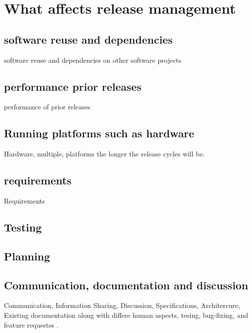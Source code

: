 \section{ What affects release management}

\subsection{software reuse and dependencies}
software reuse and dependencies on other software projects\citep{VitharanaKing_et_al2010}

\subsection{performance prior releases}

performance of prior releases \citep{Society2014} 

\subsection{Running platforms such as hardware}

Hardware, multiple, platforms the longer the release cycles will be. 

\subsection{requirements}

Requirements \citep{MullerHerbst_et_al2006,StarkOman_et_al1999,KakolaKoivulahtiOjala2009,KakolaKoivulahtiOjala_et_al2010}


\subsection{Testing}

\subsection{Planning}

\subsection{Communication, documentation and discussion}

Communication, Information Sharing, Discussion, Specifications, Architercure, Existing documentation along with differe human aspects, tesing, bug-fixing, and feature requestes  \citep{DeodharSaxena_et_al2012}. 

